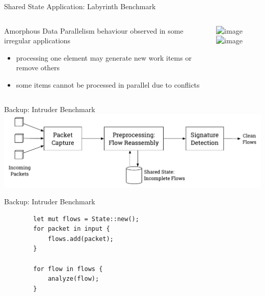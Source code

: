 \documentclass[aspectratio=169, usenames, dvipsnames]{beamer}
\begin{document}
\begin{frame}{Shared State Application: Labyrinth Benchmark}
  \begin{columns}
    \begin{column}{0.5\textwidth}
        \begin{block}{Amorphous Data Parallelism}
            behaviour observed in some irregular applications
        \end{block}

        \hfill

        \begin{itemize}
            \item<2-> processing one element may generate new work items or remove others
            \item<4-> some items cannot be processed in parallel due to conflicts
        \end{itemize}
    \end{column}
    \begin{column}{0.5\textwidth}
      \begin{center}
        \includegraphics<1-2>[width=.9\textwidth]{img/5-maze_update3}%
        \includegraphics<3->[width=.9\textwidth]{img/6-maze_update-noconflict}%
      \end{center}
    \end{column}
  \end{columns}
\end{frame}

\begin{frame}{Backup: Intruder Benchmark}
    \centering
    \includegraphics[width=\textwidth,keepaspectratio]{img/experiments-intruder}
\end{frame}

\begin{frame}[fragile]{Backup: Intruder Benchmark}
    \centering
    \begin{verbatim}
        let mut flows = State::new();
        for packet in input {
            flows.add(packet);
        }

        for flow in flows {
            analyze(flow);
        }
    \end{verbatim}
\end{frame}
\end{document}
